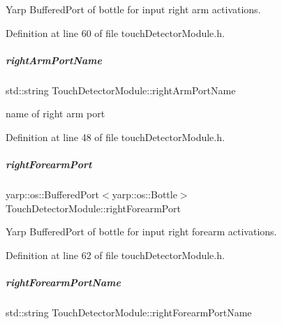 Yarp Buffered\+Port of bottle for input right arm activations. 



Definition at line 60 of file touch\+Detector\+Module.\+h.

\mbox{\label{group__touchDetector_a7aa8558ce23f4f46b0ff536e5283b0a5}} 
\subparagraph{\texorpdfstring{right\+Arm\+Port\+Name}{rightArmPortName}}
{\footnotesize\ttfamily std\+::string Touch\+Detector\+Module\+::right\+Arm\+Port\+Name\hspace{0.3cm}{\ttfamily [protected]}}



name of right arm port 



Definition at line 48 of file touch\+Detector\+Module.\+h.

\mbox{\label{group__touchDetector_ac75d232aa9a909bcff0579539662dd2a}} 
\subparagraph{\texorpdfstring{right\+Forearm\+Port}{rightForearmPort}}
{\footnotesize\ttfamily yarp\+::os\+::\+Buffered\+Port$<$yarp\+::os\+::\+Bottle$>$ Touch\+Detector\+Module\+::right\+Forearm\+Port\hspace{0.3cm}{\ttfamily [protected]}}



Yarp Buffered\+Port of bottle for input right forearm activations. 



Definition at line 62 of file touch\+Detector\+Module.\+h.

\mbox{\label{group__touchDetector_a907d6a20fce66d9f5b2ae0030a01b46c}} 
\subparagraph{\texorpdfstring{right\+Forearm\+Port\+Name}{rightForearmPortName}}
{\footnotesize\ttfamily std\+::string Touch\+Detector\+Module\+::right\+Forearm\+Port\+Name\hspace{0.3cm}{\ttfamily [protected]}}



